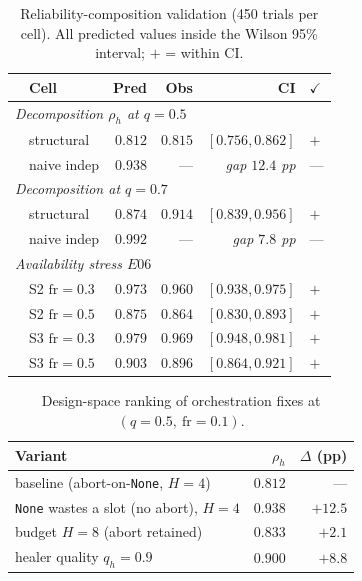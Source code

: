 \documentclass[journal,10pt,twocolumn]{IEEEtran}
\begin{document}
\begin{table}[t]
\caption{Reliability-composition validation (450 trials per cell). All predicted values inside the Wilson 95\%
interval; $+$ = within CI.}
\label{tab:comp}
\centering
\small
\begin{tabular}{@{}rlrrrl@{}}
\toprule
 & Cell & Pred & Obs & CI & $\checkmark$\\
\midrule
\multicolumn{6}{l}{\emph{Decomposition $\rho_{h}$ at $q{=}0.5$}}\\
 & structural & $0.812$ & $0.815$ & $[0.756,0.862]$ & $+$\\
 & naive indep & $0.938$ & --- & \emph{gap $12.4$ pp} & ---\\
\multicolumn{6}{l}{\emph{Decomposition at $q{=}0.7$}}\\
 & structural & $0.874$ & $0.914$ & $[0.839,0.956]$ & $+$\\
 & naive indep & $0.992$ & --- & \emph{gap $7.8$ pp} & ---\\
\multicolumn{6}{l}{\emph{Availability stress $E06$}}\\
 & S2 $\mathrm{fr}{=}0.3$ & $0.973$ & $0.960$ & $[0.938,0.975]$ & $+$\\
 & S2 $\mathrm{fr}{=}0.5$ & $0.875$ & $0.864$ & $[0.830,0.893]$ & $+$\\
 & S3 $\mathrm{fr}{=}0.3$ & $0.979$ & $0.969$ & $[0.948,0.981]$ & $+$\\
 & S3 $\mathrm{fr}{=}0.5$ & $0.903$ & $0.896$ & $[0.864,0.921]$ & $+$\\
\bottomrule
\end{tabular}
\end{table}

\begin{table}[t]
\caption{Design-space ranking of orchestration fixes at $(q{=}0.5,\ \mathrm{fr}{=}0.1)$.}
\label{tab:int}
\centering
\small
\begin{tabular}{@{}lrr@{}}
\toprule
Variant & $\rho_h$ & $\Delta$ (pp)\\
\midrule
baseline (abort-on-\texttt{None}, $H{=}4$) & $0.812$ & ---\\
\texttt{None} wastes a slot (no abort), $H{=}4$ & $0.938$ & $+12.5$\\
budget $H{=}8$ (abort retained) & $0.833$ & $+2.1$\\
healer quality $q_h{=}0.9$ & $0.900$ & $+8.8$\\
\bottomrule
\end{tabular}
\end{table}
\end{document}
